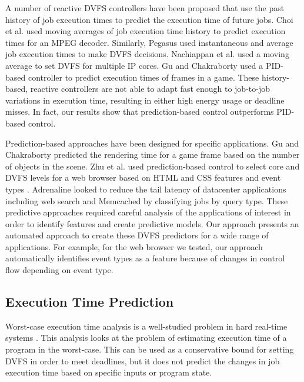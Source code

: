 A number of reactive DVFS controllers have been proposed that use the past
history of job execution times to predict the execution time of future jobs.
Choi et al. \cite{choi-iccad02} used moving averages of job execution time
history to predict execution times for an MPEG decoder. Similarly, Pegasus
\cite{pegasus-isca14} used instantaneous and average job execution times to
make DVFS decisions. Nachiappan et al. \cite{nachiappan-hpca15} used a moving
average to set DVFS for multiple IP cores. Gu and Chakraborty \cite{gu-dac08}
used a PID-based controller to predict execution times of frames in a game.
These history-based, reactive controllers are not able to adapt fast enough to
job-to-job variations in execution time, resulting in either high energy usage
or deadline misses. In fact, our results show that prediction-based control
outperforms PID-based control.

Prediction-based approaches have been designed for specific applications. Gu
and Chakraborty \cite{gu-rtas08} predicted the rendering time for a game frame
based on the number of objects in the scene. Zhu et al. used prediction-based
control to select core and DVFS levels for a web browser based on HTML and CSS
features \cite{zhu-hpca13} and event types \cite{eqos-hpca15}. Adrenaline
\cite{adrenaline-hpca15} looked to reduce the tail latency of datacenter
applications including web search and Memcached by classifying jobs by query
type. These predictive approaches required careful analysis of the applications
of interest in order to identify features and create predictive models.  Our
approach presents an automated approach to create these DVFS predictors for a
wide range of applications. For example, for the web browser we tested, our
approach automatically identifies event types as a feature because of changes
in control flow depending on event type.

\subsection{Execution Time Prediction}

Worst-case execution time analysis is a well-studied problem in hard real-time
systems \cite{wcetsurvey-tecs08}. This analysis looks at the problem of
estimating execution time of a program in the worst-case. This can be used as a
conservative bound for setting DVFS in order to meet deadlines, but it does not
predict the changes in job execution time based on specific inputs or program
state.

